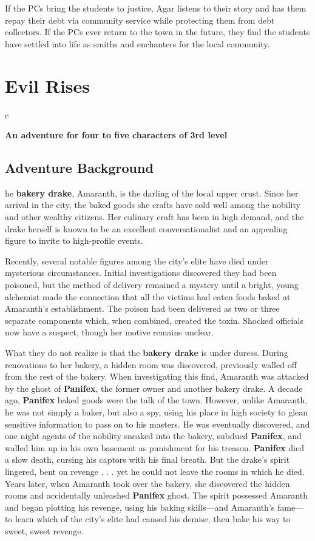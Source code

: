 \documentclass[10pt,a4paper,twoside,bg=print,twocolumn,openany,nodeprecatedcode]{dndbook}
\begin{document}
If the PCs bring the students to justice, Agar listens to their story and has them repay their debt via community service while protecting them from debt collectors. If the PCs ever return to the town in the future, they find the students have settled into life as smiths and enchanters for the local community.

\chapter{Evil Rises}

\begin{DndTable}{c}

\textbf{An adventure for four to five characters of 3rd level}\\
\end{DndTable}

\section{Adventure Background}
he \textbf{bakery drake}, Amaranth, is the darling of the local upper crust. Since her arrival in the city, the baked goods she crafts have sold well among the nobility and other wealthy citizens. Her culinary craft has been in high demand, and the drake herself is known to be an excellent conversationalist and an appealing figure to invite to high-profile events.


Recently, several notable figures among the city's elite have died under mysterious circumstances. Initial investigations discovered they had been poisoned, but the method of delivery remained a mystery until a bright, young alchemist made the connection that all the victims had eaten foods baked at Amaranth's establishment. The poison had been delivered as two or three separate components which, when combined, created the toxin. Shocked officials now have a suspect, though her motive remains unclear.

What they do not realize is that the \textbf{bakery drake} is under duress. During renovations to her bakery, a hidden room was discovered, previously walled off from the rest of the bakery. When investigating this find, Amaranth was attacked by the ghost of \textbf{Panifex}, the former owner and another bakery drake. A decade ago, \textbf{Panifex} baked goods were the talk of the town. However, unlike Amaranth, he was not simply a baker, but also a spy, using his place in high society to glean sensitive information to pass on to his masters. He was eventually discovered, and one night agents of the nobility sneaked into the bakery, subdued \textbf{Panifex}, and walled him up in his own basement as punishment for his treason. \textbf{Panifex} died a slow death, cursing his captors with his final breath. But the drake's spirit lingered, bent on revenge . . . yet he could not leave the rooms in which he died. Years later, when Amaranth took over the bakery, she discovered the hidden rooms and accidentally unleashed \textbf{Panifex} ghost. The spirit possessed Amaranth and began plotting his revenge, using his baking skills—and Amaranth's fame—to learn which of the city's elite had caused his demise, then bake his way to sweet, sweet revenge.
\end{document}
